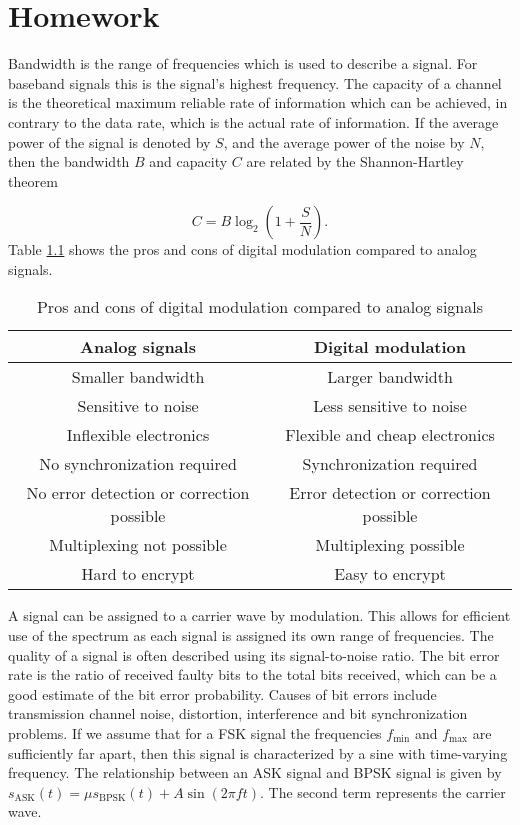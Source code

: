 \documentclass[11pt,titlepage]{report}
\begin{document}
\chapter{Homework}
Bandwidth is the range of frequencies which is used to describe a signal. For baseband signals this is the signal's highest frequency. The capacity of a channel is the  theoretical maximum reliable rate of information which can be achieved, in contrary to the data rate, which is the actual rate of information. If the average power of the signal is denoted by $S$, and the average power of the noise by $N$, then the bandwidth $B$ and capacity $C$ are related by the Shannon-Hartley theorem

\begin{equation}
	C=B \log_2{\left(1+\frac{S}{N}\right)}.
\end{equation}
Table \ref{tab:pros-cons} shows the pros and cons of digital modulation compared to analog signals.

\begin{table}[H]
	\centering
	\caption{Pros and cons of digital modulation compared to analog signals}
	\label{tab:pros-cons}
	\begin{tabular}{c c}
		\hline\hline
		Analog signals & Digital modulation \\
		\hline
		Smaller bandwidth & Larger bandwidth \\
		Sensitive to noise & Less sensitive to noise \\
		Inflexible electronics & Flexible and cheap electronics \\
		No synchronization required & Synchronization required \\
		No error detection or correction possible & Error detection or correction possible \\
		Multiplexing not possible & Multiplexing possible \\
		Hard to encrypt & Easy to encrypt \\
		\hline
	\end{tabular}
\end{table}

A signal can be assigned to a carrier wave by modulation. This allows for efficient use of the spectrum as each signal is assigned its own range of frequencies. The quality of a signal is often described using its signal-to-noise ratio. The bit error rate is the ratio of received faulty bits to the total bits received, which can be a good estimate of the bit error probability. Causes of bit errors include transmission channel noise, distortion, interference and bit synchronization problems. If we assume that for a FSK signal the frequencies $f_{\text{min}}$ and $f_{\text{max}}$ are sufficiently far apart, then this signal is characterized by a sine with time-varying frequency. The relationship between an ASK signal and BPSK signal is given by $s_{\text{ASK}}(t) = \mu s_{\text{BPSK}}(t) + A \sin{(2 \pi f t)}$. The second term represents the carrier wave.
\end{document}
